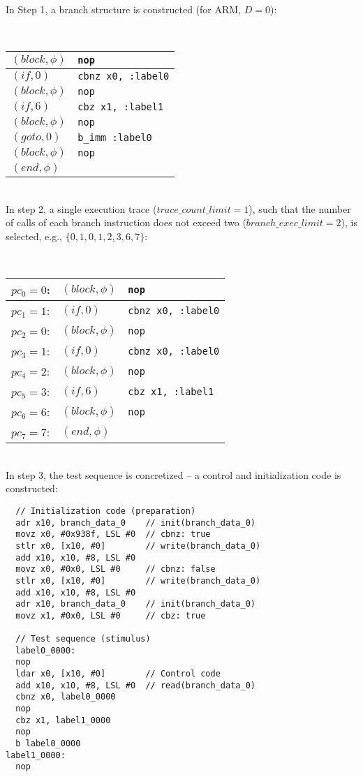 In Step 1, a branch structure is constructed (for ARM, $D = 0$):

~\\
\begin{tabular}{|l|l|}
\hline
$(block, \phi)$	& \texttt{nop}\\
\hline
$(if, 0)$       & \texttt{cbnz x0, :label0}\\
\hline
$(block, \phi)$ & \texttt{nop}\\
\hline
$(if, 6)$       & \texttt{cbz x1,  :label1}\\
\hline
$(block, \phi)$ & \texttt{nop}\\
\hline
$(goto, 0)$     & \texttt{b\_imm    :label0}\\
\hline
$(block, \phi)$ & \texttt{nop}\\
\hline
$(end, \phi)$   & \\
\hline
\end{tabular}
~\\

In step 2, a single execution trace ($trace\_count\_limit = 1$),
such that the number of calls of each branch instruction does not exceed two ($branch\_exec\_limit = 2$),
is selected, e.g., $\{0, 1, 0, 1, 2, 3, 6, 7\}$:

~\\
\begin{tabular}{|l|l|l|}
\hline
$pc_0=0$: & $(block, \phi)$ & \texttt{nop}\\
\hline
$pc_1=1$: & $(if, 0)$       & \texttt{cbnz x0, :label0}\\
\hline
$pc_2=0$: & $(block, \phi)$ & \texttt{nop}\\
\hline
$pc_3=1$: & $(if, 0)$       & \texttt{cbnz x0, :label0}\\
\hline
$pc_4=2$: & $(block, \phi)$ & \texttt{nop}\\
\hline
$pc_5=3$: & $(if, 6)$       & \texttt{cbz x1,  :label1}\\
\hline
$pc_6=6$: & $(block, \phi)$ & \texttt{nop}\\
\hline
$pc_7=7$: & $(end, \phi)$   & \\
\hline
\end{tabular}
~\\

In step 3, the test sequence is concretized -- a control and initialization code is constructed:

\begin{lstlisting}
  // Initialization code (preparation)
  adr x10, branch_data_0    // init(branch_data_0)
  movz x0, #0x938f, LSL #0  // cbnz: true
  stlr x0, [x10, #0]        // write(branch_data_0)
  add x10, x10, #8, LSL #0
  movz x0, #0x0, LSL #0     // cbnz: false
  stlr x0, [x10, #0]        // write(branch_data_0)
  add x10, x10, #8, LSL #0
  adr x10, branch_data_0    // init(branch_data_0)
  movz x1, #0x0, LSL #0     // cbz: true

  // Test sequence (stimulus)
  label0_0000:
  nop
  ldar x0, [x10, #0]        // Control code
  add x10, x10, #8, LSL #0  // read(branch_data_0)
  cbnz x0, label0_0000
  nop
  cbz x1, label1_0000
  nop
  b label0_0000
label1_0000:
  nop
\end{lstlisting}
